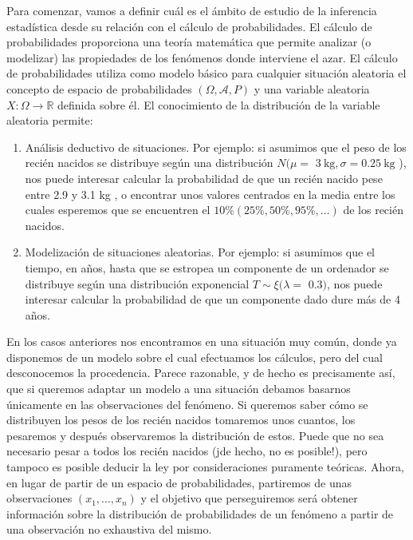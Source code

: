 \documentclass[
]{article}
\providecommand{\tightlist}{%
  \setlength{\itemsep}{0pt}\setlength{\parskip}{0pt}}
\begin{document}
Para comenzar, vamos a definir cuál es el ámbito de estudio de la inferencia estadística desde su relación con el cálculo de probabilidades. El cálculo de probabilidades proporciona una teoría matemática que permite analizar (o modelizar) las propiedades de los fenómenos donde interviene el azar.
El cálculo de probabilidades utiliza como modelo básico para cualquier situación aleatoria el concepto de espacio de probabilidades \((\Omega, \mathcal{A}, P)\) y una variable aleatoria \(X: \Omega \rightarrow \mathbb{R}\) definida sobre él.
El conocimiento de la distribución de la variable aleatoria permite:

\begin{enumerate}
\def\labelenumi{\arabic{enumi}.}
\tightlist
\item
  Análisis deductivo de situaciones. Por ejemplo: si asumimos que el peso de los recién nacidos se distribuye según una distribución \(N(\mu=\) \(3 \mathrm{~kg}, \sigma=0.25 \mathrm{~kg}\) ), nos puede interesar calcular la probabilidad de que un recién nacido pese entre 2.9 y 3.1 kg , o encontrar unos valores centrados en la media entre los cuales esperemos que se encuentren el \(10 \%(25 \%, 50 \%, 95 \%, \ldots)\) de los recién nacidos.
\item
  Modelización de situaciones aleatorias. Por ejemplo: si asumimos que el tiempo, en años, hasta que se estropea un componente de un ordenador se distribuye según una distribución exponencial \(T \sim \xi(\lambda=\) \(0.3)\), nos puede interesar calcular la probabilidad de que un componente dado dure más de 4 años.
\end{enumerate}

En los casos anteriores nos encontramos en una situación muy común, donde ya disponemos de un modelo sobre el cual efectuamos los cálculos, pero del cual desconocemos la procedencia. Parece razonable, y de hecho es precisamente así, que si queremos adaptar un modelo a una situación debamos basarnos únicamente en las observaciones del fenómeno.
Si queremos saber cómo se distribuyen los pesos de los recién nacidos tomaremos unos cuantos, los pesaremos y después observaremos la distribución de estos. Puede que no sea necesario pesar a todos los recién nacidos (jde hecho, no es posible!), pero tampoco es posible deducir la ley por consideraciones puramente teóricas.
Ahora, en lugar de partir de un espacio de probabilidades, partiremos de unas observaciones \(\left(x_{1}, \ldots, x_{n}\right)\) y el objetivo que perseguiremos será obtener información sobre la distribución de probabilidades de un fenómeno a partir de una observación no exhaustiva del mismo.
\end{document}
